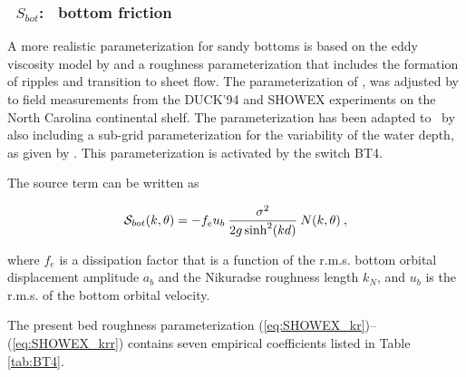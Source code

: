 \vsssub
\subsubsection{~$S_{bot}$: \showex\ bottom friction} \label{sec:BT4}
\vsssub


\noindent 
A more realistic parameterization for sandy bottoms is based on the eddy
viscosity model by \cite{art:GM79} and a roughness parameterization that
includes the formation of ripples and transition to sheet flow. The
parameterization of \cite{tol:JPO94}, was adjusted by \cite{art:Aea03a} to
field measurements from the DUCK'94 and SHOWEX experiments on the North
Carolina continental shelf. The parameterization has been adapted to \ws\ by
also including a sub-grid parameterization for the variability of the water
depth, as given by \cite{tol:CE95}. This parameterization is activated by the
switch BT4.

The source term can be written as


\begin{equation}
\cS_{bot}(k,\theta) = - f_e u_b \: \frac{\sigma^2}{2 g \sinh^2(kd)} \: N(k,\theta)
\: , \label{eq:SHOWEX_bot}
\end{equation}

\noindent
where $f_e$ is a dissipation factor that is a function of the r.m.s. bottom orbital 
displacement amplitude $a_b$ and the Nikuradse roughness length $k_N$, and 
$u_b$ is the r.m.s. of the bottom orbital 
velocity.

The present bed roughness parameterization
(\ref{eq:SHOWEX_kr})--(\ref{eq:SHOWEX_krr}) contains seven empirical
coefficients listed in Table \ref{tab:BT4}.

